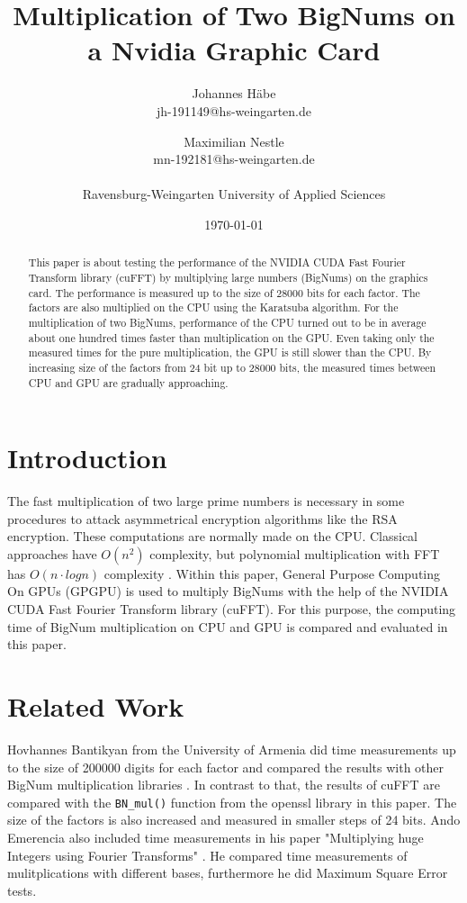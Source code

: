 \documentclass[12pt,a4paper]{article}
\title{Multiplication of Two BigNums on a Nvidia Graphic Card}
\author{Johannes H\"abe  \\
	jh-191149@hs-weingarten.de
	\and 
	Maximilian Nestle \\
	mn-192181@hs-weingarten.de \\\\
	Ravensburg-Weingarten University of Applied Sciences
	}
\date{\today}
\begin{document}
\maketitle
%
\begin{abstract}
This paper is about testing the performance of the NVIDIA CUDA Fast Fourier Transform library (cuFFT) by multiplying large numbers (BigNums) on the graphics card. The performance is measured up to the size of 28000 bits for each factor. The factors are also multiplied on the CPU using the Karatsuba algorithm. For the multiplication of two BigNums, performance of the CPU turned out to be in average about one hundred times faster than multiplication on the GPU. Even taking only the measured times for the pure multiplication, the GPU is still slower than the CPU. By increasing size of the factors from 24 bit up to 28000 bits, the measured times between CPU and GPU are gradually approaching.
\end{abstract}

\section{Introduction}
The fast multiplication of two large prime numbers is necessary in some procedures to attack asymmetrical encryption algorithms like the RSA encryption. These computations are normally made on the CPU. Classical approaches have $O(n^2)$ complexity, but polynomial multiplication with FFT has $O(n \cdot logn)$ complexity \cite{bantikyan2014big}. Within this paper, General Purpose Computing On GPUs (GPGPU) is used to multiply BigNums with the help of the NVIDIA CUDA Fast Fourier Transform library (cuFFT). For this purpose, the computing time of BigNum multiplication on CPU and GPU is compared and evaluated in this paper.

\section{Related Work}
Hovhannes Bantikyan from the University of Armenia did time measurements up to the size of 200000 digits for each factor and compared the results with other BigNum multiplication libraries \cite{bantikyan2014big}. In contrast to that, the results of cuFFT are compared with the \texttt{BN_mul()} function from the openssl library in this paper. The size of the factors is also increased and measured in smaller steps of 24 bits. Ando Emerencia also included time measurements in his paper "Multiplying huge Integers using Fourier Transforms" \cite{emerencia2007multiplying}. He compared time measurements of mulitplications with different bases, furthermore he did Maximum Square Error tests.
\end{document}

